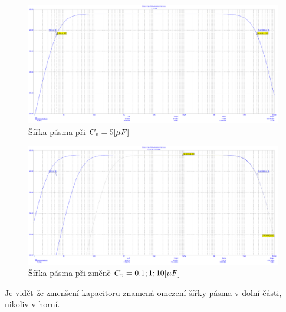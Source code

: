 \documentclass{article}
\begin{document}
\hfill
\begin{figure}[H]
  \includegraphics[width=\textwidth]{PC/BJT/Sirka_pasma.png}
  \caption{\label{sirka_pasma} Šířka pásma při \(C_v = 5\-[\mu F]\)}
\end{figure}
\begin{figure}[H]
  \includegraphics[width=\textwidth]{PC/BJT/Step_sirka_pasma.png}
  \caption{\label{Pohyb_sirky_pasma} Šířka pásma při změně \(C_v = 0.1;1;10\-[\mu F]\)}
\end{figure}
Je vidět že zmenšení kapacitoru znamená omezení šířky pásma v dolní části, nikoliv v horní.

\newpage
\end{document}

